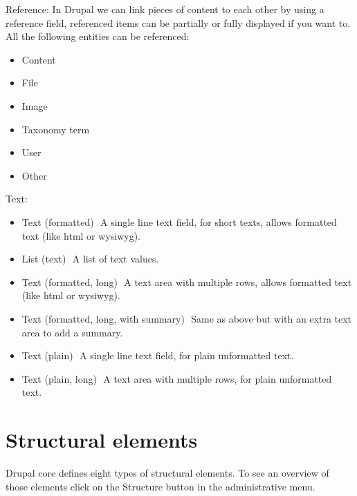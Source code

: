Reference: 
In Drupal we can link pieces of content to each other by using a reference field, referenced items can be partially or fully displayed if you want to. All the following entities can be referenced: 
\begin{itemize}  
    \item Content 
    \item File 
    \item Image 
    \item Taxonomy term 
    \item User 
    \item Other 
\end{itemize}

Text:
\begin{itemize}
    \item Text (formatted) ­ A single line text field, for short texts, allows formatted text (like html or wysiwyg). 
    \item List (text) ­ A list of text values. 
    \item Text (formatted, long) ­ A text area with multiple rows, allows formatted text (like html or wysiwyg). 
    \item Text (formatted, long, with summary) ­ Same as above but with an extra text area to add a summary. 
    \item Text (plain) ­ A single line text field, for plain unformatted text. 
    \item Text (plain, long) ­ A text area with multiple rows, for plain unformatted text. 
\end{itemize}


\section{Structural elements}
Drupal core defines eight types of structural elements. To see an overview of those elements click on the Structure button in the administrative menu.


